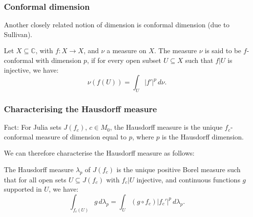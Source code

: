 \documentclass{beamer} %
\theoremstyle{definition} %
\newcommand{\Rl}{\mathbb{R}}
\newcommand{\Cplx}{\mathbb{C}}
\begin{document}
%     

\begin{frame}\frametitle{Conformal dimension}
    Another closely related notion of dimension is conformal dimension (due to Sullivan).
    
    Let $X \subseteq \Cplx$, with $f:X\to X$, and $\nu$ a measure on $X$. The measure $\nu$ is said to be
    $f$-conformal with dimension $p$, if for every open subset $U \subseteq X$ such that $f|U$ is injective, we have:
    \begin{equation*}
        \nu(f(U)) = \int_{U} |f'|^p\,d\nu.
    \end{equation*}
\end{frame}

\begin{frame}\frametitle{Characterising the Hausdorff measure}
    Fact: For Julia sets $J(f_c)$, $c \in M_0$, the Hausdorff measure is the unique $f_c$-conformal measure of dimension equal to $p$, where $p$ is the Hausdorff dimension.
    
    We can therefore characterise the Hausdorff measure as follows:
    \begin{theorem}
        The Hausdorff measure $\lambda_p$ of $J(f_c)$ is the unique positive Borel measure such that for all open sets $U\subseteq J(f_c)$ with $f_c|U$ injective,
        and continuous functions $g$ supported in $U$, we have:
        \begin{equation*}
            \int_{f_c(U)} g\,d\lambda_p = \int_U (g\circ f_c)|f_c'|^p\,d\lambda_p.
        \end{equation*}
    \end{theorem}
\end{frame}
\end{document}
